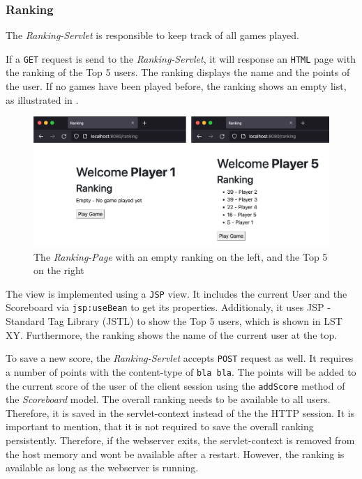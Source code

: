 \subsubsection{Ranking}\label{subsubsec:03_impl_backend_ranking}
The \textit{Ranking-Servlet} is responsible to keep track of all games played.

If a \texttt{GET} request is send to the \textit{Ranking-Servlet}, it will response an \texttt{HTML} page with the ranking of the Top 5 users. The ranking displays the name and the points of the user. If no games have been played before, the ranking shows an empty list, as illustrated in .
\begin{figure}[h]
\centering
\includegraphics[scale=0.2]{images/03_impl/ranking/ranking}
\caption{The \textit{Ranking-Page} with an empty ranking on the left, and the Top 5 on the right}
\label{fig:03_impl_backend_ranking_page}
\end{figure}

The view is implemented using a \texttt{JSP} view. It includes the current User and the Scoreboard via \texttt{jsp:useBean} to get its properties.
Additionaly, it uses JSP - Standard Tag Library (JSTL) to show the Top 5 users, which is shown in LST XY. Furthermore, the ranking shows the name of the current user at the top.


To save a new score, the \textit{Ranking-Servlet} accepts \texttt{POST} request as well. It requires a number of points with the content-type of \texttt{bla bla}.
The points will be added to the current score of the user of the client session using the \texttt{addScore} method of the \textit{Scoreboard} model.
The overall ranking needs to be available to all users. Therefore, it is saved in the servlet-context instead of the the HTTP session.
It is important to mention, that it is not required to save the overall ranking persistently. Therefore, if the webserver exits, the servlet-context is removed from the host memory and wont be available after a restart. However, the ranking is available as long as the webserver is running.

